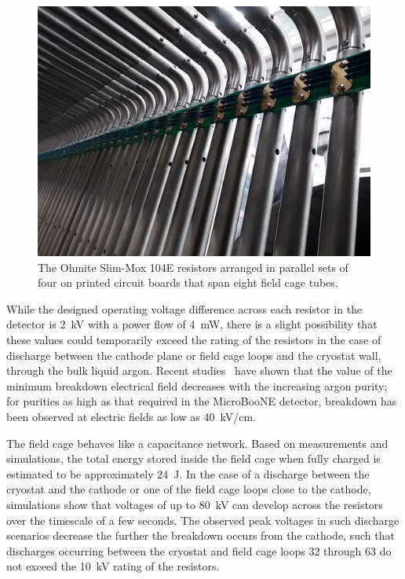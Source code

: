 \begin{figure}[htb]
\centering	
\includegraphics[width=0.8\linewidth]{figures/tpc-voltage-divider-slimmox.jpg}
\caption{The Ohmite Slim-Mox 104E resistors arranged in parallel sets of four on printed circuit boards that span eight field cage tubes.}
\label{fig:tpc-voltage-divider-slimmox}
\end{figure}

While the designed operating voltage difference across each resistor in the detector is 2~kV with a power flow of 4~mW, there is a slight possibility that these values could temporarily exceed the rating of the resistors in the case of discharge between the cathode plane or field cage loops and the cryostat wall, through the bulk liquid argon. Recent studies~\cite{HVCpaper} have shown that the value of the minimum breakdown electrical field decreases with the increasing argon purity; for purities as high as that required in the MicroBooNE detector, breakdown has been observed at electric fields as low as 40~kV/cm.

The field cage behaves like a capacitance network. Based on measurements and simulations, the total energy stored inside the field cage when fully charged is estimated to be approximately 24~J. In the case of a discharge between the cryostat and the cathode or one of the field cage loops close to the cathode, simulations show that voltages of up to 80~kV can develop across the resistors over the timescale of a few seconds. The observed peak voltages in such discharge scenarios decrease the further the breakdown occurs from the cathode, such that discharges occurring between the cryostat and field cage loops 32 through 63 do not exceed the 10~kV rating of the resistors.


